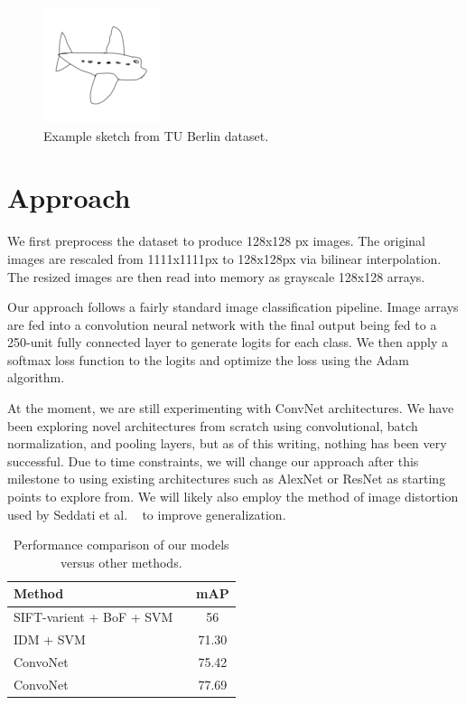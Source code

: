 \documentclass[10pt,twocolumn,letterpaper]{article}
\begin{document}
\begin{figure}[h]
	\begin{center}
	\includegraphics[width=0.5\linewidth]{airplane}
	\caption{Example sketch from TU Berlin dataset.}
	\end{center}
\end{figure}


\section{Approach}
We first preprocess the dataset to produce 128x128 px images. The original images are rescaled from 1111x1111px to 128x128px via bilinear interpolation. The resized images are then read into memory as grayscale 128x128 arrays.

Our approach follows a fairly standard image classification pipeline. Image arrays are fed into a convolution neural network with the final output being fed to a 250-unit fully connected layer to generate logits for each class. We then apply a softmax loss function to the logits and optimize the loss using the Adam algorithm.

At the moment, we are still experimenting with ConvNet architectures. We have been exploring novel architectures from scratch using convolutional, batch normalization, and pooling layers, but as of this writing, nothing has been very successful. Due to time constraints, we will change our approach after this milestone to using existing architectures such as AlexNet or ResNet as starting points to explore from. We will likely also employ the method of image distortion used by Seddati et al. ~\cite{seddati2015deepsketch} to improve generalization.

\begin{table}[h]
\begin{center}
\begin{tabular}{|l|c|}
\hline
Method & mAP \\
\hline\hline
SIFT-varient + BoF + SVM  ~\cite{eitz2012hdhso}  &  56 \\
IDM + SVM ~\cite{yesilbek2015svm} & 71.30 \\
ConvoNet ~\cite{seddati2015deepsketch}  & 75.42\\
ConvoNet ~\cite{seddati2016deepsketch} & 77.69\\
\hline
\end{tabular}
\end{center}
\caption{Performance comparison of our models versus other methods.}
\end{table}
\end{document}
